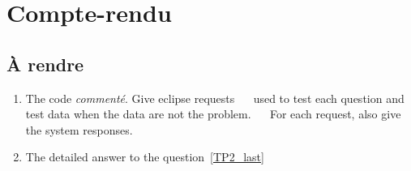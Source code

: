 % 
% 
% 

\section{Compte-rendu}

\subsection{À rendre}

\begin{enumerate}
\item The code \eclipse{} \emph{commenté}. Give eclipse requests
   used to test each question and test data when the data are not the problem.
   For each request, also give the system responses.
\item The detailed answer to the question~\ref{TP2_last} 
\end{enumerate}


